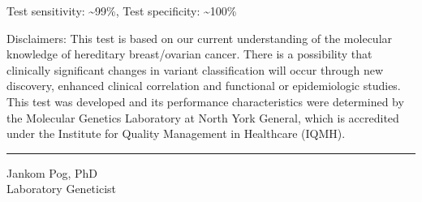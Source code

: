 \documentclass[10pt]{article}
\begin{document}
{Test sensitivity: \textasciitilde 99\%, Test specificity: \textasciitilde 100\%

Disclaimers:  This test is based on our current understanding of the molecular knowledge of hereditary breast/ovarian cancer. There is a possibility that clinically significant changes in variant classification will occur through new discovery, enhanced clinical correlation and functional or epidemiologic studies. This test was developed and its performance characteristics were determined by the Molecular Genetics Laboratory at North York General, which is accredited under the Institute for Quality Management in Healthcare (IQMH).
}

\vspace{4em}
\hfill \parbox{7cm}{
\rule{7cm}{1pt}
\small
Jankom Pog, PhD \\
Laboratory Geneticist
}
\end{document}
